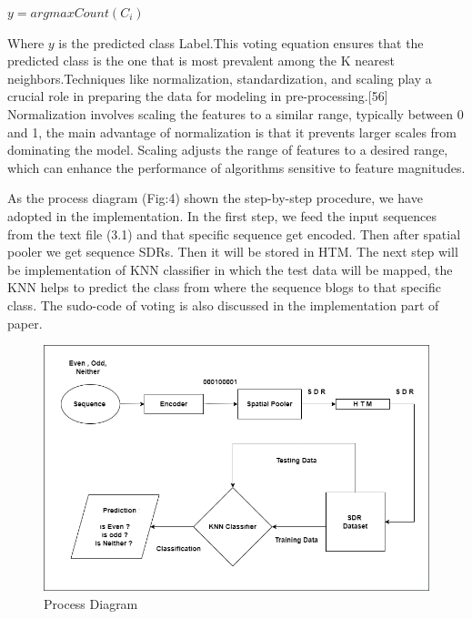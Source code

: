 \documentclass[conference]{IEEEtran}
\begin{document}
\begin{math} y = argmax Count(C_i) 
\end{math}


Where \begin{math} y\end{math} is the predicted class Label.This voting equation ensures that the predicted class is the one that is most prevalent among the K nearest neighbors.Techniques like normalization, standardization, and scaling play a crucial role in preparing the data for modeling in pre-processing.[56] Normalization involves scaling the features to a similar range, typically between 0 and 1, the main advantage of normalization is that it prevents larger scales from dominating the model. Scaling adjusts the range of features to a desired range, which can enhance the performance of algorithms sensitive to feature magnitudes.

As the process diagram (Fig:4) shown the step-by-step procedure, we have adopted in the implementation. In the first step, we feed the input sequences from the text file (3.1) and that specific sequence get encoded. Then after spatial pooler we get sequence SDRs. Then it will be stored in HTM. The next step will be implementation of KNN classifier in which the test data will be mapped, the KNN helps to predict the class from where the sequence blogs to that specific class. The sudo-code of voting is also discussed in the implementation part of paper. 





\begin{figure}
    \centering
    \includegraphics[width=1.0\linewidth]{Process Diagram.png}
    \caption{Process Diagram}
    \label{fig:enter-label}
\end{figure}
\end{document}
